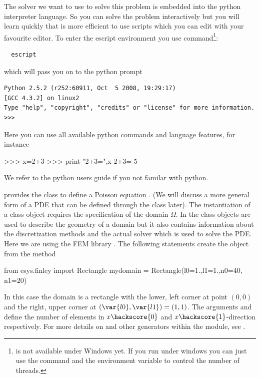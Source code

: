 The \escript solver we want to use to solve this problem is embedded into the python interpreter language. So you can solve the problem interactively but you will learn quickly 
that is more efficient to use scripts which you can edit with your favourite editor. 
To enter the escript environment you use  command\footnote{ is not available under Windows yet. If you run under windows you can just use the
 command and the  environment variable to control the number
of threads.}:
\begin{verbatim}
  escript
\end{verbatim}
which will pass you on to the python prompt
\begin{verbatim}
Python 2.5.2 (r252:60911, Oct  5 2008, 19:29:17) 
[GCC 4.3.2] on linux2
Type "help", "copyright", "credits" or "license" for more information.
>>> 
\end{verbatim}
Here you can use all available python commands and language features, for instance
\begin{python}
 >>> x=2+3
>>> print "2+3=",x
2+3= 5
\end{python}
We refer to the python users guide if you not familar with python.

\escript provides the class \Poisson to define a Poisson equation .
(We will discuss a more general form of a PDE  
that can be defined through the \LinearPDE class later). The instantiation of
a \Poisson class object requires the specification of the domain $\Omega$. In \escript
the \Domain class objects are used to describe the geometry of a domain but it also
contains information about the discretization methods and the actual solver which is used
to solve the PDE. Here we are using the FEM library \finley {}. The following statements create the \Domain object  from the 
\finley method 
\begin{python}
  from esys.finley import Rectangle
  mydomain = Rectangle(l0=1.,l1=1.,n0=40, n1=20)
\end{python}
In this case the domain is a rectangle with the lower, left corner at point $(0,0)$ and
the right, upper corner at $(\var{l0},\var{l1})=(1,1)$.
The arguments  and  define the number of elements in $x\hackscore{0}$ and
$x\hackscore{1}$-direction respectively. For more details on  and
other \Domain generators within the \finley module,
see .

